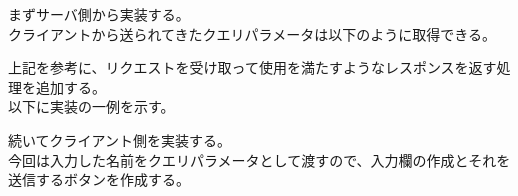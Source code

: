 まずサーバ側から実装する。\\
クライアントから送られてきたクエリパラメータは以下のように取得できる。

\begin{Shaded}
\begin{Highlighting}[]
\OperatorTok{=}  \NormalTok{)}\NormalTok{(}\NormalTok{)}\OperatorTok{;}
\end{Highlighting}
\end{Shaded}

上記を参考に、リクエストを受け取って使用を満たすようなレスポンスを返す処理を追加する。\\
以下に実装の一例を示す。

\begin{Shaded}
\begin{Highlighting}[]
   \OperatorTok{===}  \OperatorTok{\&\&}\OperatorTok{===} \NormalTok{ )\{}
    \OperatorTok{=}  \NormalTok{)}\NormalTok{(}\NormalTok{)}\OperatorTok{;}
      \NormalTok{(} \OperatorTok{+}\OperatorTok{;}
\NormalTok{  \}}
\end{Highlighting}
\end{Shaded}

続いてクライアント側を実装する。\\
今回は入力した名前をクエリパラメータとして渡すので、入力欄の作成とそれを送信するボタンを作成する。

\begin{Shaded}
\begin{Highlighting}[]
  \DataTypeTok{\textless{}}\OperatorTok{=}\OperatorTok{=}\DataTypeTok{\textgreater{}}
  \DataTypeTok{\textless{}}\OperatorTok{=}\DataTypeTok{\textgreater{}}\DataTypeTok{\textless{}/}\DataTypeTok{\textgreater{}}
\end{Highlighting}
\end{Shaded}

